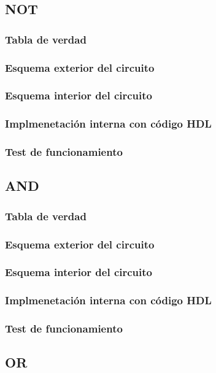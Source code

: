 \documentclass[12pt]{article}
\begin{document}
    \subsection{NOT}
        \subsubsection{Tabla de verdad}
        \subsubsection{Esquema exterior del circuito}
        \subsubsection{Esquema interior del circuito}
        \subsubsection{Implmenetación interna con código HDL}
        \subsubsection{Test de funcionamiento}
    \newpage
    \subsection{AND}
        \subsubsection{Tabla de verdad}
        \subsubsection{Esquema exterior del circuito}
        \subsubsection{Esquema interior del circuito}
        \subsubsection{Implmenetación interna con código HDL}
        \subsubsection{Test de funcionamiento}      
    \newpage  
    \subsection{OR}
\end{document}
